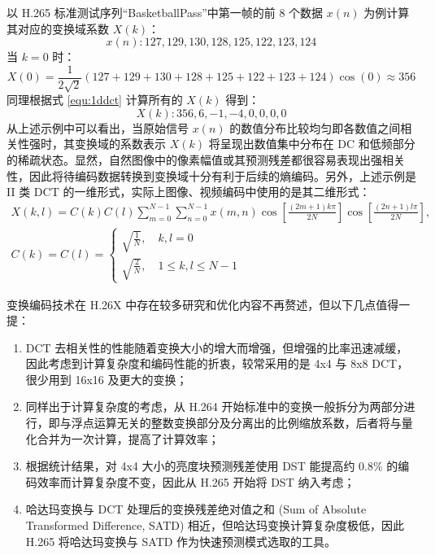 以 H.265 标准测试序列“BasketballPass”中第一帧的前 8 个数据 $x(n)$ 为例计算其对应的变换域系数 $X(k)$：
\[
    x(n): 127,129,130,128,125,122,123,124
\]
当 $k=0$ 时：
\[
    X(0)=\frac{1}{2\sqrt{2}}(127+129+130+128+125+122+123+124)\cos(0)\approx 356
\]
同理根据式 \ref{equ:1ddct} 计算所有的 $X(k)$ 得到：
\[
    X(k): 356,6,-1,-4,0,0,0,0
\]
从上述示例中可以看出，当原始信号 $x(n)$ 的数值分布比较均匀即各数值之间相关性强时，其变换域的系数表示 $X(k)$ 将呈现出数值集中分布在 DC 和低频部分的稀疏状态。显然，自然图像中的像素幅值或其预测残差都很容易表现出强相关性，因此将待编码数据转换到变换域十分有利于后续的熵编码。另外，上述示例是 II 类 DCT 的一维形式，实际上图像、视频编码中使用的是其二维形式：
\begin{equation}
    \begin{gathered}
        X(k,l)=C(k)C(l)\sum_{m=0}^{N-1}\sum_{n=0}^{N-1}x(m,n)\cos\left[\frac{(2m+1)k\pi}{2N}\right]\cos\left[\frac{(2n+1)l\pi}{2N}\right], \\
        C(k)=C(l)=
        \begin{cases}
            \sqrt{\frac{1}{N}}, \quad k,l=0 \\
            \sqrt{\frac{2}{N}}, \quad 1 \leqslant k,l \leqslant N-1
        \end{cases}
    \end{gathered}
    \label{equ:2ddct}
\end{equation}

变换编码技术在 H.26X 中存在较多研究和优化内容不再赘述，但以下几点值得一提：
\begin{enumerate}
    \item DCT 去相关性的性能随着变换大小的增大而增强，但增强的比率迅速减缓，因此考虑到计算复杂度和编码性能的折衷，较常采用的是 4x4 与 8x8 DCT，很少用到 16x16 及更大的变换；
    \item 同样出于计算复杂度的考虑，从 H.264 开始标准中的变换一般拆分为两部分进行，即与浮点运算无关的整数变换部分及分离出的比例缩放系数，后者将与量化合并为一次计算，提高了计算效率；
    \item 根据统计结果，对 4x4 大小的亮度块预测残差使用 DST 能提高约 0.8\% 的编码效率而计算复杂度不变，因此从 H.265 开始将 DST 纳入考虑；
    \item 哈达玛变换与 DCT 处理后的变换残差绝对值之和 (Sum of Absolute Transformed Difference, SATD) 相近，但哈达玛变换计算复杂度极低，因此 H.265 将哈达玛变换与 SATD 作为快速预测模式选取的工具。
\end{enumerate}

